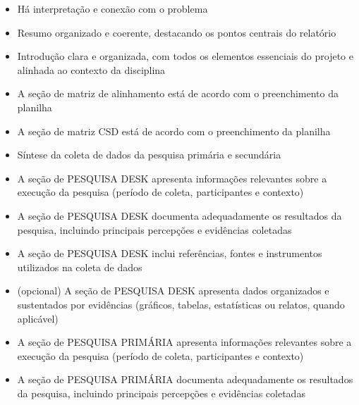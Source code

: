 \documentclass[
  sigconf,
  nonacm, %
  language=portuguese
]{acmart}
\begin{document}
\begin{itemize}[leftmargin=14pt,itemsep=1pt,topsep=3pt,parsep=0pt]
  \item[\textcolor{cgood}{$\checkmark$}] {\small\textcolor{cgood}{Há interpretação e conexão com o problema}}
  \item[\textcolor{cgood}{$\checkmark$}] {\small\textcolor{cgood}{Resumo organizado e coerente, destacando os pontos centrais do relatório}}
  \item[\textcolor{cgood}{$\checkmark$}] {\small\textcolor{cgood}{Introdução clara e organizada, com todos os elementos essenciais do projeto e alinhada ao contexto da disciplina}}
  \item[\textcolor{cgood}{$\checkmark$}] {\small\textcolor{cgood}{A seção de matriz de alinhamento está de acordo com o preenchimento da planilha}}
  \item[\textcolor{cgood}{$\checkmark$}] {\small\textcolor{cgood}{A seção de matriz CSD está de acordo com o preenchimento da planilha}}
  \item[\textcolor{cgood}{$\checkmark$}] {\small\textcolor{cgood}{Síntese da coleta de dados da pesquisa primária e secundária}}
  \item[\textcolor{cgood}{$\checkmark$}] {\small\textcolor{cgood}{A seção de PESQUISA DESK apresenta informações relevantes sobre a execução da pesquisa (período de coleta, participantes e contexto)}}
  \item[\textcolor{cgood}{$\checkmark$}] {\small\textcolor{cgood}{A seção de PESQUISA DESK documenta adequadamente os resultados da pesquisa, incluindo principais percepções e evidências coletadas}}
  \item[\textcolor{cgood}{$\checkmark$}] {\small\textcolor{cgood}{A seção de PESQUISA DESK inclui referências, fontes e instrumentos utilizados na coleta de dados}}
  \item[\textcolor{cgood}{$\checkmark$}] {\small\textcolor{cgood}{(opcional) A seção de PESQUISA DESK apresenta dados organizados e sustentados por evidências (gráficos, tabelas, estatísticas ou relatos, quando aplicável)}}
  \item[\textcolor{cgood}{$\checkmark$}] {\small\textcolor{cgood}{A seção de PESQUISA PRIMÁRIA apresenta informações relevantes sobre a execução da pesquisa (período de coleta, participantes e contexto)}}
  \item[\textcolor{cgood}{$\checkmark$}] {\small\textcolor{cgood}{A seção de PESQUISA PRIMÁRIA documenta adequadamente os resultados da pesquisa, incluindo principais percepções e evidências coletadas}}

\end{itemize}
\end{document}

